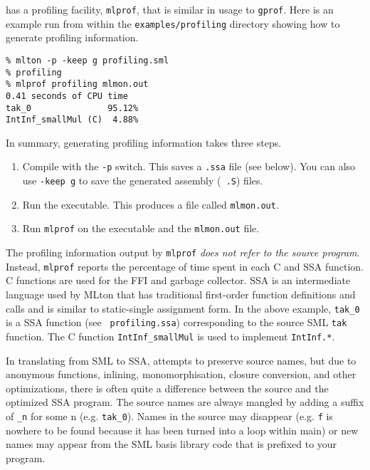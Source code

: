 
{\mlton} has a profiling facility, {\tt mlprof}, that is similar in usage
to {\tt gprof}.  Here is an example run from within the {\tt examples/profiling}
directory showing how to generate profiling information.

\begin{verbatim}
% mlton -p -keep g profiling.sml
% profiling
% mlprof profiling mlmon.out
0.41 seconds of CPU time
tak_0               95.12%
IntInf_smallMul (C)  4.88%
\end{verbatim}
In summary, generating profiling information takes three steps.
\begin{enumerate}

\item Compile with the {\tt -p} switch.  This saves a {\tt .ssa} file (see
below).  You can also use {\tt -keep g} to save the generated assembly ({\tt
.S}) files.

\item Run the executable.  This produces a file called {\tt mlmon.out}.

\item Run {\tt mlprof} on the executable and the {\tt mlmon.out} file.

\end{enumerate}
The profiling information output by {\tt mlprof} {\em does not refer to the
source program}.  Instead, {\tt mlprof} reports the percentage of time spent in
each C and SSA function.  C functions are used for the FFI and garbage
collector.  SSA is an intermediate language used by MLton that has traditional
first-order function definitions and calls and is similar to static-single
assignment form.  In the above example, {\tt tak\_0} is a SSA function (see {\tt
profiling.ssa}) corresponding to the source SML {\tt tak} function.  The C
function {\tt IntInf\_smallMul} is used to implement {\tt IntInf.*}.

In translating from SML to SSA, {\mlton} attempts to preserve source names, but
due to anonymous functions, inlining, monomorphisation, closure conversion, and
other optimizations, there is often quite a difference between the source and
the optimized SSA program.  The source names are always mangled by adding a
suffix of {\tt \_n} for some n (e.g. {\tt tak\_0}).  Names in the source may
disappear (e.g. {\tt f} is nowhere to be found because it has been turned into a
loop within main) or new names may appear from the SML basis library code that
is prefixed to your program.

